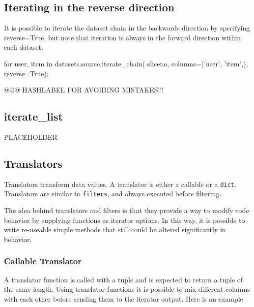 \subsection{Iterating in the reverse direction}

It is possible to iterate the dataset chain in the backwards direction
by specifying reverse=True, but note that iteration is always in the
forward direction within each dataset.

\begin{python}
for user, item in datasets.source.iterate_chain(
    sliceno,
    columns=('user', 'item',),
    reverse=True):
\end{python}

@@@ HASHLABEL FOR AVOIDING MISTAKES!!!

\subsection{iterate\_list}
PLACEHOLDER


\subsection{Translators}

Translators transform data values. A translator is either a callable or
a \texttt{dict}.  Translators are similar to \texttt{filters}, and
always executed before filtering.

The idea behind translators and filters is that they provide a way to
modify code behavior by supplying functions as iterator options.  In
this way, it is possible to write re-useable simple methods that still
could be altered significantly in behavior.



\subsubsection*{Callable Translator}

A translator function is called with a tuple and is expected to return
a tuple of the same length.  Using translator functions it is possible
to mix different columns with each other before sending them to the
iterator output.  Here is an example


